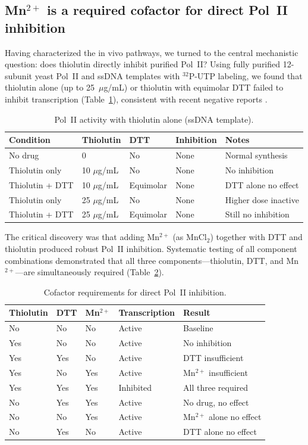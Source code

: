 \documentclass[11pt,a4paper]{article}
\begin{document}
\subsection{Mn$^{2+}$ is a required cofactor for direct Pol~II inhibition}

Having characterized the in vivo pathways, we turned to the central mechanistic question: does thiolutin directly inhibit purified Pol~II? Using fully purified 12-subunit yeast Pol~II and ssDNA templates with $^{32}$P-UTP labeling, we found that thiolutin alone (up to 25~$\mu$g/mL) or thiolutin with equimolar DTT failed to inhibit transcription (Table~\ref{tab:initial}), consistent with recent negative reports \citep{Lauber2016}.

\begin{table}[htbp]
\centering
\caption{Pol~II activity with thiolutin alone (ssDNA template).}
\label{tab:initial}
\begin{tabular}{lllll}
\toprule
\textbf{Condition} & \textbf{Thiolutin} & \textbf{DTT} & \textbf{Inhibition} & \textbf{Notes} \\
\midrule
No drug & 0 & No & None & Normal synthesis \\
Thiolutin only & 10 $\mu$g/mL & No & None & No inhibition \\
Thiolutin + DTT & 10 $\mu$g/mL & Equimolar & None & DTT alone no effect \\
Thiolutin only & 25 $\mu$g/mL & No & None & Higher dose inactive \\
Thiolutin + DTT & 25 $\mu$g/mL & Equimolar & None & Still no inhibition \\
\bottomrule
\end{tabular}
\end{table}

The critical discovery was that adding Mn$^{2+}$ (as MnCl$_2$) together with DTT and thiolutin produced robust Pol~II inhibition. Systematic testing of all component combinations demonstrated that all three components---thiolutin, DTT, and Mn$^{2+}$---are simultaneously required (Table~\ref{tab:cofactors}).

\begin{table}[htbp]
\centering
\caption{Cofactor requirements for direct Pol~II inhibition.}
\label{tab:cofactors}
\begin{tabular}{lllll}
\toprule
\textbf{Thiolutin} & \textbf{DTT} & \textbf{Mn$^{2+}$} & \textbf{Transcription} & \textbf{Result} \\
\midrule
No & No & No & Active & Baseline \\
Yes & No & No & Active & No inhibition \\
Yes & Yes & No & Active & DTT insufficient \\
Yes & No & Yes & Active & Mn$^{2+}$ insufficient \\
Yes & Yes & Yes & Inhibited & All three required \\
No & Yes & Yes & Active & No drug, no effect \\
No & No & Yes & Active & Mn$^{2+}$ alone no effect \\
No & Yes & No & Active & DTT alone no effect \\
\bottomrule
\end{tabular}
\end{table}
\end{document}
